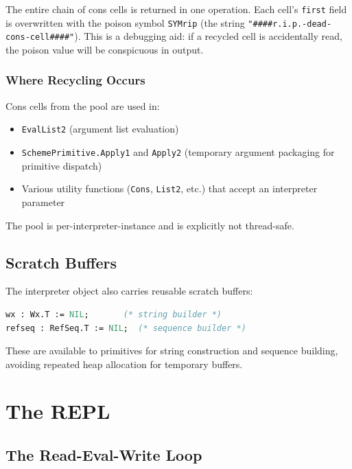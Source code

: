 \documentclass[12pt]{report}
\begin{document}
The entire chain of cons cells is returned in one operation.  Each
cell's \texttt{first} field is overwritten with the poison symbol
\texttt{SYMrip} (the string \texttt{"\#\#\#\#r.i.p.-dead-cons-cell\#\#\#\#"}).
This is a debugging aid: if a recycled cell is accidentally read, the
poison value will be conspicuous in output.

\subsection{Where Recycling Occurs}

Cons cells from the pool are used in:

\begin{itemize}
\item \texttt{EvalList2} (argument list evaluation)
\item \texttt{SchemePrimitive.Apply1} and \texttt{Apply2} (temporary
  argument packaging for primitive dispatch)
\item Various utility functions (\texttt{Cons}, \texttt{List2}, etc.)
  that accept an interpreter parameter
\end{itemize}

The pool is per-interpreter-instance and is explicitly not thread-safe.

\section{Scratch Buffers}

The interpreter object also carries reusable scratch buffers:

\begin{lstlisting}[language=Modula3]
wx : Wx.T := NIL;       (* string builder *)
refseq : RefSeq.T := NIL;  (* sequence builder *)
\end{lstlisting}

These are available to primitives for string construction and sequence
building, avoiding repeated heap allocation for temporary buffers.

\chapter{The REPL}
\label{ch:repl}

\section{The Read-Eval-Write Loop}
\end{document}
